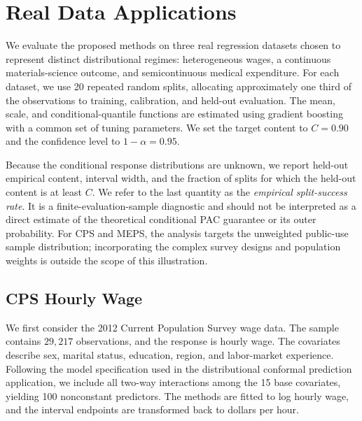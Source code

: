 
\section{Real Data Applications}
\label{sec:real-data}

We evaluate the proposed methods on three real regression datasets chosen to
represent distinct distributional regimes: heterogeneous wages, a continuous
materials-science outcome, and semicontinuous medical expenditure. For each
dataset, we use 20 repeated random splits, allocating approximately one third of
the observations to training, calibration, and held-out evaluation. The mean,
scale, and conditional-quantile functions are estimated using gradient boosting
with a common set of tuning parameters. We set the target content to
\(C=0.90\) and the confidence level to \(1-\alpha=0.95\).

Because the conditional response distributions are unknown, we report held-out
empirical content, interval width, and the fraction of splits for which the
held-out content is at least \(C\). We refer to the last quantity as the
\emph{empirical split-success rate}. It is a finite-evaluation-sample diagnostic
and should not be interpreted as a direct estimate of the theoretical
conditional PAC guarantee or its outer probability. For CPS and MEPS, the
analysis targets the unweighted public-use sample distribution; incorporating
the complex survey designs and population weights is outside the scope of this
illustration.

\subsection{CPS Hourly Wage}

We first consider the 2012 Current Population Survey wage data. The sample
contains \(29{,}217\) observations, and the response is hourly wage. The
covariates describe sex, marital status, education, region, and labor-market
experience. Following the model specification used in the distributional
conformal prediction application, we include all two-way interactions among the
15 base covariates, yielding 100 nonconstant predictors. The methods are fitted
to log hourly wage, and the interval endpoints are transformed back to dollars
per hour.

